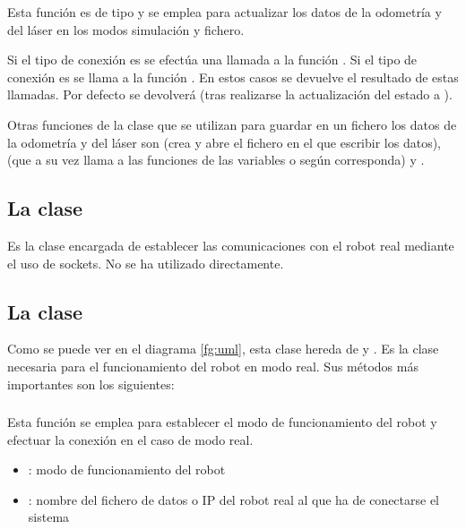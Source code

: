 \noindent
Esta función es de tipo  y se emplea para actualizar los datos de la odometría y del láser en los modos simulación y fichero.

\noindent
Si el tipo de conexión es  se efectúa una llamada a la función . Si el tipo de conexión es  se llama a la función . En estos casos se devuelve el resultado de estas llamadas. Por defecto se devolverá  (tras realizarse la actualización del estado a ).

\vspace{0.2cm}
Otras funciones de la clase que se utilizan para guardar en un fichero los datos de la odometría y del láser son  (crea y abre el fichero en el que escribir los datos),  (que a su vez llama a las funciones  de las variables  o  según corresponda) y .

\subsection{La clase }
Es la clase encargada de establecer las comunicaciones con el robot real mediante el uso de sockets. No se ha utilizado directamente.

\subsection{La clase }
Como se puede ver en el diagrama \ref{fg:uml}, esta clase hereda de y . Es la clase necesaria para el funcionamiento del robot en modo real. Sus métodos más importantes son los siguientes:

\subsubsection{}

\noindent
{}

\noindent
Esta función se emplea para establecer el modo de funcionamiento del robot y efectuar la conexión en el caso de modo real.
\begin{itemize}
  \item {}: modo de funcionamiento del robot
  \item {}: nombre del fichero de datos o IP del robot real al que ha de conectarse el sistema
\end{itemize}

